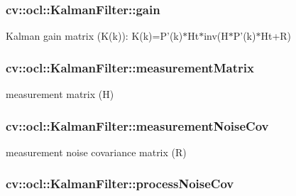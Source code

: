 \hypertarget{classcv_1_1ocl_1_1KalmanFilter_a426dbaf80ff0c39347badfc47c2320a3}{
\subsubsection[{gain}]{ cv\-::ocl\-::\-Kalman\-Filter\-::gain}}\label{classcv_1_1ocl_1_1KalmanFilter_a426dbaf80ff0c39347badfc47c2320a3}


Kalman gain matrix (K(k))\-: K(k)=P'(k)$\ast$\-Ht$\ast$inv(H$\ast$\-P'(k)$\ast$\-Ht+\-R) 

\hypertarget{classcv_1_1ocl_1_1KalmanFilter_ad3c86cdbe65d9efaf008f23eba39441c}{
\subsubsection[{measurement\-Matrix}]{ cv\-::ocl\-::\-Kalman\-Filter\-::measurement\-Matrix}}\label{classcv_1_1ocl_1_1KalmanFilter_ad3c86cdbe65d9efaf008f23eba39441c}


measurement matrix (H) 

\hypertarget{classcv_1_1ocl_1_1KalmanFilter_a492394c2d843a14f3e070808593a9c55}{
\subsubsection[{measurement\-Noise\-Cov}]{ cv\-::ocl\-::\-Kalman\-Filter\-::measurement\-Noise\-Cov}}\label{classcv_1_1ocl_1_1KalmanFilter_a492394c2d843a14f3e070808593a9c55}


measurement noise covariance matrix (R) 

\hypertarget{classcv_1_1ocl_1_1KalmanFilter_ae76b58392465d7d5ac4df75ca67edf96}{
\subsubsection[{process\-Noise\-Cov}]{ cv\-::ocl\-::\-Kalman\-Filter\-::process\-Noise\-Cov}}\label{classcv_1_1ocl_1_1KalmanFilter_ae76b58392465d7d5ac4df75ca67edf96}


